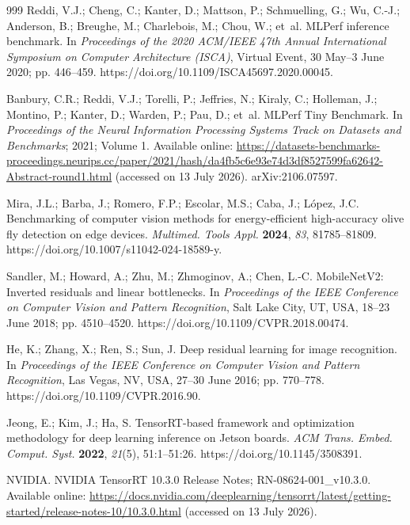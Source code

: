 \documentclass[electronics,article,submit,pdftex,moreauthors]{Definitions/mdpi}
\newcommand{\etal}{et~al.}
\begin{document}
\begin{thebibliography}{999}
Reddi, V.J.; Cheng, C.; Kanter, D.; Mattson, P.; Schmuelling, G.; Wu, C.-J.; Anderson, B.; Breughe, M.; Charlebois, M.; Chou, W.; \etal{} MLPerf inference benchmark. In \emph{Proceedings of the 2020 ACM/IEEE 47th Annual International Symposium on Computer Architecture (ISCA)}, Virtual Event, 30 May--3 June 2020; pp. 446--459. https://doi.org/10.1109/ISCA45697.2020.00045.

Banbury, C.R.; Reddi, V.J.; Torelli, P.; Jeffries, N.; Kiraly, C.; Holleman, J.; Montino, P.; Kanter, D.; Warden, P.; Pau, D.; \etal{} MLPerf Tiny Benchmark. In \emph{Proceedings of the Neural Information Processing Systems Track on Datasets and Benchmarks}; 2021; Volume 1. Available online: \url{https://datasets-benchmarks-proceedings.neurips.cc/paper/2021/hash/da4fb5c6e93e74d3df8527599fa62642-Abstract-round1.html} (accessed on 13 July 2026). arXiv:2106.07597.

Mira, J.L.; Barba, J.; Romero, F.P.; Escolar, M.S.; Caba, J.; L\'opez, J.C. Benchmarking of computer vision methods for energy-efficient high-accuracy olive fly detection on edge devices. \emph{Multimed. Tools Appl.} \textbf{2024}, \emph{83}, 81785--81809. https://doi.org/10.1007/s11042-024-18589-y.

Sandler, M.; Howard, A.; Zhu, M.; Zhmoginov, A.; Chen, L.-C. MobileNetV2: Inverted residuals and linear bottlenecks. In \emph{Proceedings of the IEEE Conference on Computer Vision and Pattern Recognition}, Salt Lake City, UT, USA, 18--23 June 2018; pp. 4510--4520. https://doi.org/10.1109/CVPR.2018.00474.

He, K.; Zhang, X.; Ren, S.; Sun, J. Deep residual learning for image recognition. In \emph{Proceedings of the IEEE Conference on Computer Vision and Pattern Recognition}, Las Vegas, NV, USA, 27--30 June 2016; pp. 770--778. https://doi.org/10.1109/CVPR.2016.90.

Jeong, E.; Kim, J.; Ha, S. TensorRT-based framework and optimization methodology for deep learning inference on Jetson boards. \emph{ACM Trans. Embed. Comput. Syst.} \textbf{2022}, \emph{21}(5), 51:1--51:26. https://doi.org/10.1145/3508391.

NVIDIA. NVIDIA TensorRT 10.3.0 Release Notes; RN-08624-001\_v10.3.0. Available online: \url{https://docs.nvidia.com/deeplearning/tensorrt/latest/getting-started/release-notes-10/10.3.0.html} (accessed on 13 July 2026).


\end{thebibliography}
\end{document}
